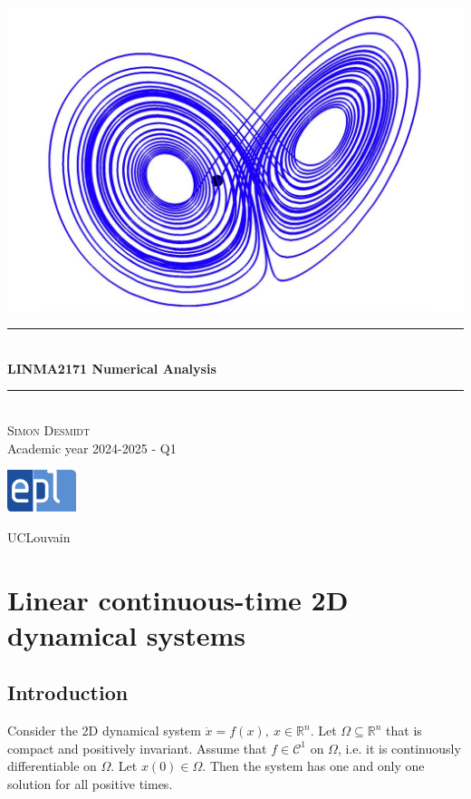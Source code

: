 \documentclass[12pt, openany]{report}
\newcommand{\HRule}{\rule{\linewidth}{0.5mm}}
\begin{document}
\begin{titlepage}
    \begin{sffamily}
    \begin{center}
        \includegraphics[scale=0.25]{img/page_de_garde.png} \\[1cm]
        \HRule \\[0.4cm]
        { \huge \bfseries LINMA2171 Numerical Analysis \\[0.4cm] }
    
        \HRule \\[1.5cm]
        \textsc{\LARGE Simon Desmidt}\\[1cm]
        \vfill
        \vspace{2cm}
        {\large Academic year 2024-2025 - Q1}
        \vspace{0.4cm}
         
        \includegraphics[width=0.15\textwidth]{img/epl.png}
        
        UCLouvain\\
    
    \end{center}
    \end{sffamily}
\end{titlepage}

\setcounter{tocdepth}{1}
\tableofcontents
\chapter{Linear continuous-time 2D dynamical systems}
\section{Introduction}
Consider the 2D dynamical system \(\dot x=f(x),\: x\in \mathbb{R}^n\). Let \(\Omega \subseteq \mathbb{R}^n\) that is compact and positively invariant. Assume that \(f\in \mathcal{C}^1\) on \(\Omega\), i.e. it is continuously differentiable on \(\Omega\). Let \(x(0)\in \Omega\). Then the system has one and only one solution for all positive times. \\
\end{document}
